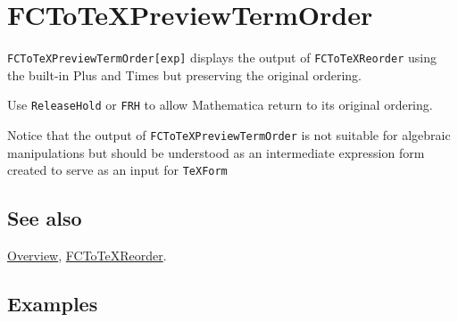 \documentclass[../FeynCalcManual.tex]{subfiles}
\begin{document}
\hypertarget{fctotexpreviewtermorder}{
\section{FCToTeXPreviewTermOrder}\label{fctotexpreviewtermorder}}

\texttt{FCToTeXPreviewTermOrder[\allowbreak{}exp]} displays the output
of \texttt{FCToTeXReorder} using the built-in Plus and Times but
preserving the original ordering.

Use \texttt{ReleaseHold} or \texttt{FRH} to allow Mathematica return to
its original ordering.

Notice that the output of \texttt{FCToTeXPreviewTermOrder} is not
suitable for algebraic manipulations but should be understood as an
intermediate expression form created to serve as an input for
\texttt{TeXForm}

\subsection{See also}

\hyperlink{toc}{Overview}, \hyperlink{fctotexreorder}{FCToTeXReorder}.

\subsection{Examples}
\end{document}
